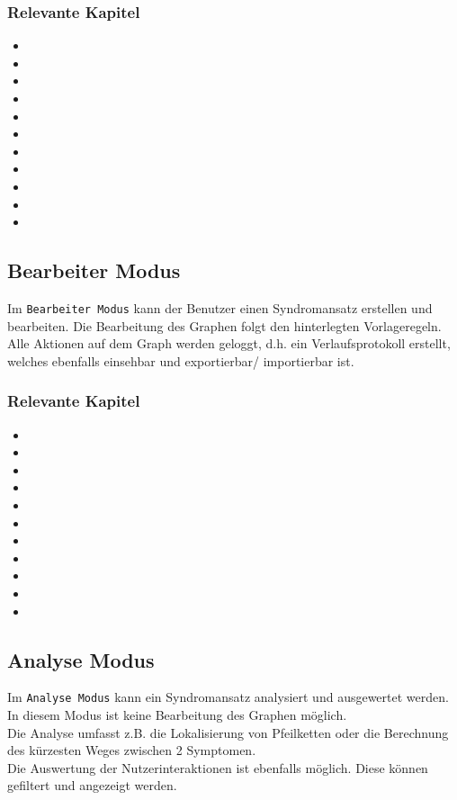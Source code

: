 \documentclass[enabledeprecatedfontcommands,fontsize=11pt,paper=a4,twoside]{scrartcl}
\newcounter{one}
\begin{document}
\subsubsection{Relevante Kapitel}
\begin{itemize}
	\item {}
	\item {}	
	\item {}
	\item {}
	\item {}
	\item {}
	\item {}
	\item {}
	\item {}
	\item {}
	\item {}	
\end{itemize}
\subsection{Bearbeiter Modus} \label{sec:editor}
Im \texttt{Bearbeiter Modus} kann der Benutzer einen Syndromansatz erstellen und bearbeiten. Die Bearbeitung des Graphen folgt den hinterlegten Vorlageregeln. Alle Aktionen auf dem Graph werden geloggt, d.h. ein Verlaufsprotokoll erstellt, welches ebenfalls einsehbar und exportierbar/ importierbar ist. 
\subsubsection{Relevante Kapitel}
\begin{itemize}
	\item {}
	\item {}	
	\item {}
	\item {}
	\item {}
	\item {}
	\item {}
	\item {}
	\item {}
	\item {}
	\item {}	
\end{itemize}
\subsection{Analyse Modus}
Im \texttt{Analyse Modus} kann ein Syndromansatz analysiert und ausgewertet werden. In diesem Modus ist keine Bearbeitung des Graphen möglich. \\
Die Analyse umfasst z.B. die Lokalisierung von Pfeilketten oder die Berechnung des kürzesten Weges zwischen 2 Symptomen. \\
Die Auswertung der Nutzerinteraktionen ist ebenfalls möglich. Diese können gefiltert und angezeigt werden. 
\end{document}
